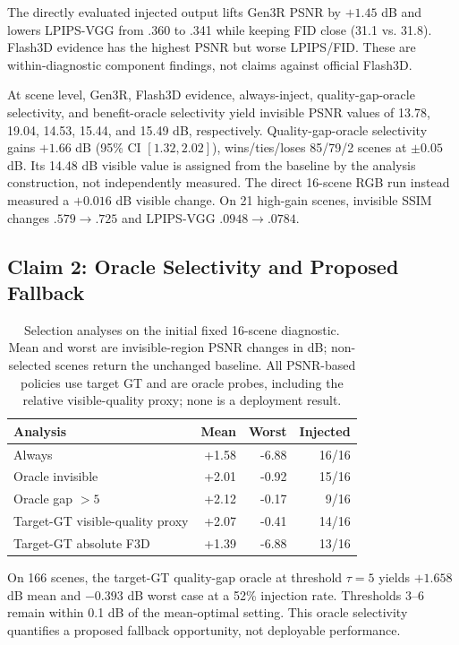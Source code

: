 \documentclass[10pt,twocolumn,letterpaper]{article}
\begin{document}
The directly evaluated injected output lifts Gen3R PSNR by $+1.45$ dB and lowers LPIPS-VGG from
.360 to .341 while keeping FID close (31.1 vs. 31.8). Flash3D evidence has the
highest PSNR but worse LPIPS/FID. These are within-diagnostic component findings,
not claims against official Flash3D.

At scene level, Gen3R, Flash3D evidence, always-inject, quality-gap-oracle
selectivity, and benefit-oracle selectivity yield invisible PSNR values of 13.78,
19.04, 14.53, 15.44, and 15.49 dB, respectively. Quality-gap-oracle selectivity
gains $+1.66$ dB (95\% CI $[1.32,2.02]$), wins/ties/loses 85/79/2 scenes at
$\pm0.05$ dB. Its 14.48 dB visible value is assigned from the baseline by the
analysis construction, not independently measured. The direct 16-scene RGB run
instead measured a $+0.016$ dB visible change. On 21 high-gain scenes, invisible
SSIM changes $.579\to.725$ and LPIPS-VGG $.0948\to.0784$.

\subsection{Claim 2: Oracle Selectivity and Proposed Fallback}
\label{sec:gate}
\begin{table}[t]
\centering\scriptsize
\caption{Selection analyses on the initial fixed 16-scene diagnostic. Mean and
worst are invisible-region PSNR changes in dB; non-selected scenes return the
unchanged baseline. All PSNR-based policies use target GT and are oracle probes,
including the relative visible-quality proxy; none is a deployment result.}
\begin{tabular}{lrrr}
\toprule
Analysis & Mean & Worst & Injected \\
\midrule
Always & +1.58 & -6.88 & 16/16 \\
Oracle invisible & +2.01 & -0.92 & 15/16 \\
Oracle gap $>5$ & +2.12 & -0.17 & 9/16 \\
Target-GT visible-quality proxy & +2.07 & -0.41 & 14/16 \\
Target-GT absolute F3D & +1.39 & -6.88 & 13/16 \\
\bottomrule
\end{tabular}
\end{table}

On 166 scenes, the target-GT quality-gap oracle at threshold $\tau=5$ yields
$+1.658$ dB mean and $-0.393$ dB worst case at a 52\% injection rate. Thresholds
3--6 remain within 0.1 dB of the mean-optimal setting. This oracle selectivity
quantifies a proposed fallback opportunity, not deployable performance.
\end{document}
